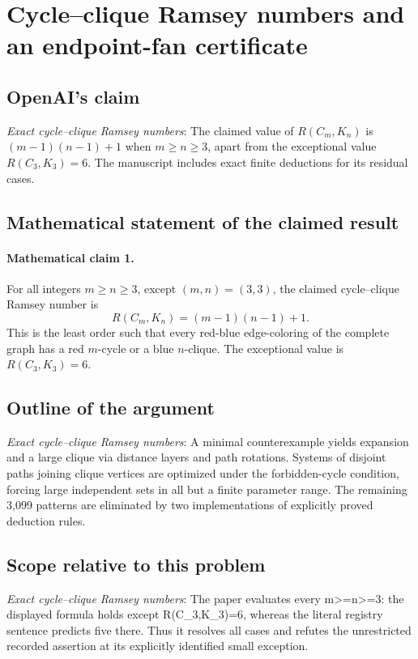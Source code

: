 \documentclass[11pt]{article}
\begin{document}
\section*{Cycle--clique Ramsey numbers and an endpoint-fan certificate}

\subsection{OpenAI's claim}
\textit{Exact cycle--clique Ramsey numbers}: The claimed value of $R(C_m,K_n)$ is $(m-1)(n-1)+1$ when $m\ge n\ge3$, apart from the exceptional value $R(C_3,K_3)=6$. The manuscript includes exact finite deductions for its residual cases.

\subsection{Mathematical statement of the claimed result}
\paragraph{Mathematical claim 1.} For all integers $m\ge n\ge3$, except $(m,n)=(3,3)$, the claimed cycle--clique Ramsey number is \[R(C_m,K_n)=(m-1)(n-1)+1.\] This is the least order such that every red-blue edge-coloring of the complete graph has a red $m$-cycle or a blue $n$-clique. The exceptional value is $R(C_3,K_3)=6$.

\subsection{Outline of the argument}
\textit{Exact cycle--clique Ramsey numbers}: A minimal counterexample yields expansion and a large clique via distance layers and path rotations. Systems of disjoint paths joining clique vertices are optimized under the forbidden-cycle condition, forcing large independent sets in all but a finite parameter range. The remaining 3,099 patterns are eliminated by two implementations of explicitly proved deduction rules.

\subsection{Scope relative to this problem}
\textit{Exact cycle--clique Ramsey numbers}: The paper evaluates every m>=n>=3: the displayed formula holds except R(C\_3,K\_3)=6, whereas the literal registry sentence predicts five there. Thus it resolves all cases and refutes the unrestricted recorded assertion at its explicitly identified small exception.
\end{document}
